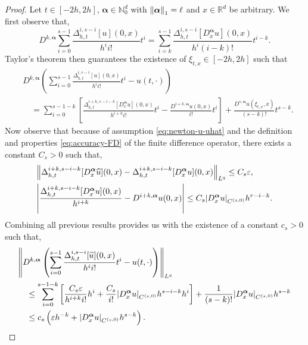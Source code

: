 \documentclass{article}
\numberwithin{equation}{section}
\newcommand{\R}{\mathbb{R}}
\newcommand{\N}{\mathbb{N}}
\newcommand{\bmalpha}{{\bm{\alpha}}}
\newcommand{\eps}{\epsilon}
\newcommand{\uhat}{{\widehat{u}}}
\renewcommand{\epsilon}{\varepsilon}
\newcommand{\1}{\mathbbm{1}}
\begin{document}
\begin{proof}
Let $t\in[-2h,2h]$, $\bmalpha\in\N^d_0$ with $\norm{\bmalpha}_1=\ell$ and $x\in\R^d$ be arbitrary. We first observe that,
\begin{equation}
   D^{k,\bmalpha}\sum_{i=0}^{s-1}\frac{\Delta^{i,s-i}_{h,t}[u](0,x)}{h^i i!}t^i = \sum_{i=k}^{s-1}\frac{\Delta^{i,s-i}_{h,t}[D^{\bmalpha}_x u](0,x)}{h^i (i-k)!}t^{i-k}. 
\end{equation}
Taylor's theorem then guarantees the existence of $\xi_{t,x}\in[-2h,2h]$ such that
\begin{equation}
\begin{split}
    &D^{k,\bmalpha}\left(\sum_{i=0}^{s-1}\frac{\Delta^{i,s-i}_{h,t}[u](0,x)}{h^i i!}t^i-u(t,\cdot)\right)\\
    &\quad = \sum_{i=0}^{s-1-k}\left[\frac{\Delta^{i+k,s-i-k}_{h,t}[D^{\bmalpha}_x u](0,x)}{h^{i+k} i!}t^{i}-\frac{D^{i+k,\bmalpha} u(0,x)}{i!}t^i\right] + \frac{D^{s,\bmalpha}u(\xi_{t,x},x)}{(s-k)!}t^{s-k}. 
\end{split}
\end{equation}
Now observe that because of assumption \eqref{eq:newton-u-uhat} and the definition and properties \eqref{eq:accuracy-FD} of the finite difference operator, there exists a constant $C_s>0$ such that,
\begin{equation}
\begin{split}
    &\norm{\Delta^{i+k,s-i-k}_{h,t}[D^{\bmalpha}_x \uhat](0,x)-\Delta^{i+k,s-i-k}_{h,t}[D^{\bmalpha}_x u](0,x)}_{L^q} \leq C_s\epsilon,\\
    &\abs{\frac{\Delta^{i+k,s-i-k}_{h,t}[D^{\bmalpha}_x u](0,x)}{h^{i+k}} - D^{i+k,\bmalpha}u(0,x)} \leq C_s \abs{D^{\bmalpha}_xu}_{C^{(s,0)}}h^{r-i-k}.
\end{split}
\end{equation}
Combining all previous results provides us with the existence of a constant $c_s>0$ such that,
\begin{equation}
    \begin{split}
        &\norm{D^{k,\bmalpha}\left(\sum_{i=0}^{s-1}\frac{\Delta^{i,s-i}_{h,t}[\uhat](0,x)}{h^i i!}t^i-u(t,\cdot)\right)}_{L^q}\\
        &\quad \leq \sum_{i=0}^{s-1-k}\left[\frac{C_s\eps}{h^{i+k} i!}h^i + \frac{C_s }{i!}\abs{D^{\bmalpha}_xu}_{C^{(s,0)}}h^{s-i-k}h^i\right] + \frac{1}{(s-k)!}\abs{D^{\bmalpha}_xu}_{C^{(s,0)}}h^{s-k}\\
        &\quad \leq c_s\left(\epsilon h^{-k}+\abs{D^{\bmalpha}_xu}_{C^{(s,0)}}h^{s-k}\right). 
    \end{split}
\end{equation}
\end{proof}
\end{document}
